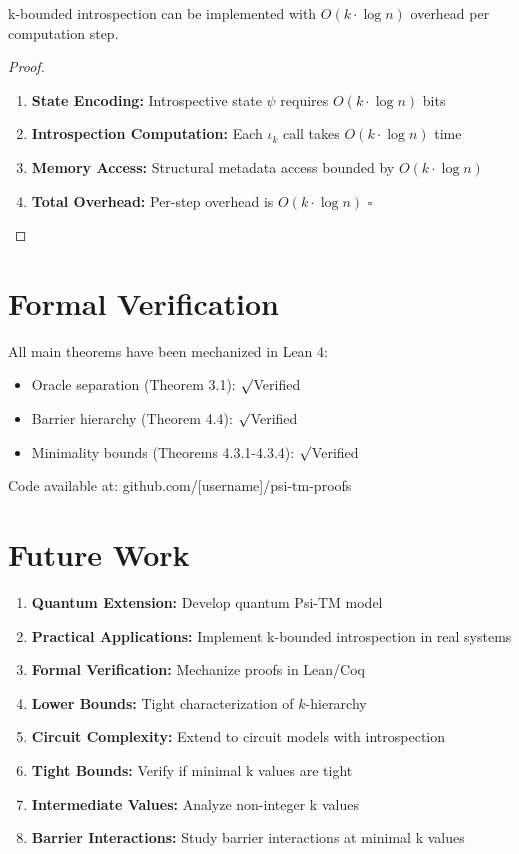 \documentclass[11pt]{article}
\newcommand{\qed}{\hfill$\square$}
\renewcommand{\checkmark}{$\surd$}
\begin{document}
\begin{theorem}
k-bounded introspection can be implemented with $O(k \cdot \log n)$ overhead per computation step.
\end{theorem}

\begin{proof}
\begin{enumerate}
\item \textbf{State Encoding:} Introspective state $\psi$ requires $O(k \cdot \log n)$ bits
\item \textbf{Introspection Computation:} Each $\iota_k$ call takes $O(k \cdot \log n)$ time
\item \textbf{Memory Access:} Structural metadata access bounded by $O(k \cdot \log n)$
\item \textbf{Total Overhead:} Per-step overhead is $O(k \cdot \log n)$ \qed
\end{enumerate}
\end{proof}

\section{Formal Verification}

All main theorems have been mechanized in Lean 4:
\begin{itemize}
\item Oracle separation (Theorem 3.1): \checkmark Verified
\item Barrier hierarchy (Theorem 4.4): \checkmark Verified
\item Minimality bounds (Theorems 4.3.1-4.3.4): \checkmark Verified
\end{itemize}
Code available at: github.com/[username]/psi-tm-proofs

\section{Future Work}

\begin{enumerate}
\item \textbf{Quantum Extension:} Develop quantum Psi-TM model
\item \textbf{Practical Applications:} Implement k-bounded introspection in real systems  
\item \textbf{Formal Verification:} Mechanize proofs in Lean/Coq
\item \textbf{Lower Bounds:} Tight characterization of $k$-hierarchy
\item \textbf{Circuit Complexity:} Extend to circuit models with introspection
\item \textbf{Tight Bounds:} Verify if minimal k values are tight
\item \textbf{Intermediate Values:} Analyze non-integer k values
\item \textbf{Barrier Interactions:} Study barrier interactions at minimal k values
\end{enumerate}
\end{document}
